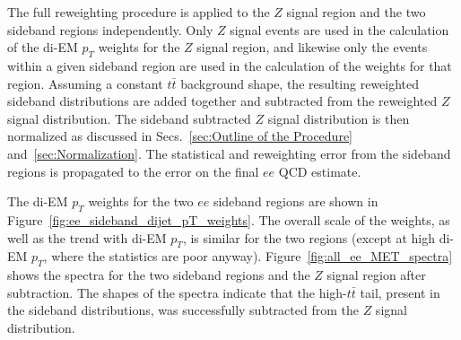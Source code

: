 \documentclass[dissertation_bw.tex]{subfiles}
\begin{document}
The full reweighting procedure is applied to the $Z$ signal region and the two sideband regions independently.  Only $Z$ signal events are used in the calculation of the di-EM $p_{T}$ weights for the $Z$ signal region, and likewise only the events within a given sideband region are used in the calculation of the weights for that region.  Assuming a constant $t\bar{t}$ background shape, the resulting reweighted sideband \MET distributions are added together and subtracted from the reweighted $Z$ signal \MET distribution.  The sideband subtracted $Z$ signal \MET distribution is then normalized as discussed in Secs.~\ref{sec:Outline of the Procedure} and~\ref{sec:Normalization}.  The statistical and reweighting error from the sideband regions is propagated to the error on the final $ee$ QCD \MET estimate.

The di-EM $p_{T}$ weights for the two $ee$ sideband regions are shown in Figure~\ref{fig:ee_sideband_dijet_pT_weights}.  The overall scale of the weights, as well as the trend with di-EM $p_{T}$, is similar for the two regions (except at high di-EM $p_{T}$, where the statistics are poor anyway).  Figure~\ref{fig:all_ee_MET_spectra} shows the \MET spectra for the two sideband regions and the $Z$ signal region after subtraction.  The shapes of the spectra indicate that the high-\MET $t\bar{t}$ tail, present in the sideband distributions, was successfully subtracted from the $Z$ signal distribution.
\end{document}

